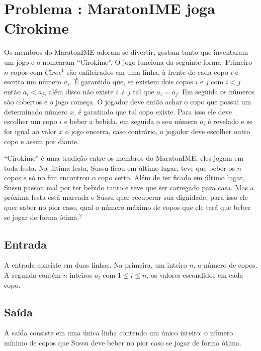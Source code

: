 \section*{Problema \proxLetra: MaratonIME joga Cîrokime}

Os membros do MaratonIME adoram se divertir, gostam tanto que inventaram um jogo e o nomearam ``Cîrokime''. O jogo funciona da seguinte forma:\newline 
Primeiro $n$ copos com $Cîroc^1$ são enfileirados em uma linha, à frente de cada copo $i$ é escrito um número $a_i$. É garantido que, se existem dois copos $i$ e $j$ com $i < j$ então $a_i < a_j$, além disso não existe $i \neq j$ tal que $a_i = a_j$. Em seguida os números são cobertos e o jogo começa.
O jogador deve então achar o copo que possui um determinado número $x$, é garatindo que tal copo existe. Para isso ele deve escolher um copo $i$ e beber a bebida, em seguida o seu número $a_i$ é revelado e se for igual ao valor $x$ o jogo encerra, caso contrário, o jogador deve escolher outro copo e assim por diante. 

``Cîrokime'' é uma tradição entre os membros do MaratonIME, eles jogam em toda festa. Na última festa, Sussu ficou em último lugar, teve que beber os $n$ copos e só no fim encontrou o copo certo. Além de ter ficado em último lugar, Sussu passou mal por ter bebido tanto e teve que ser carregado para casa. Mas a próxima festa está marcada e Sussu quer recuperar sua dignidade, para isso ele quer saber no pior caso, qual o número máximo de copos que ele terá que beber se jogar de forma ótima.$^2$

\subsection*{Entrada}
\textoDiversasInstanciasEOF

A entrada consiste em duas linhas. Na primeira, um inteiro $n$, o número de copos. A segunda contém $n$ inteiros $a_i$ com $1 \leq i \leq n$, os valores escondidos em cada copo.


\subsection*{Saída}

A saída consiste em uma única linha contendo um único inteiro: o número mínimo de copos que Sussu deve beber no pior caso se jogar de forma ótima.


